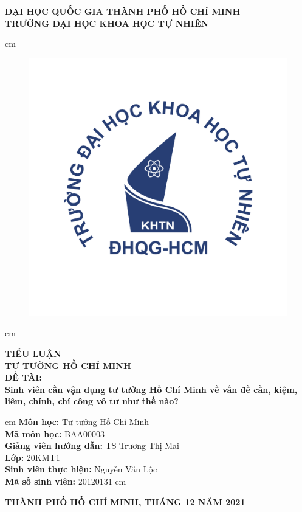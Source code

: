 \begin{titlepage}
\begin{mybox}
\begin{center}
\fontsize{12}{12}\selectfont
\textbf{ĐẠI HỌC QUỐC GIA THÀNH PHỐ HỒ CHÍ MINH}\\
\textbf{TRƯỜNG ĐẠI HỌC KHOA HỌC TỰ NHIÊN}
\end{center}
 cm
\begin{figure}[H]
\begin{center}
\includegraphics[scale=0.25]{figures/logo}
\end{center}
\end{figure}
 cm
\begin{center}
\fontsize{18}{14}\selectfont
\textbf{TIỂU LUẬN}\\
\fontsize{26}{16}\selectfont
\textbf{TƯ TƯỞNG HỒ CHÍ MINH}\\
\fontsize{18}{12}\selectfont
\textbf{ĐỀ TÀI: }\\
\textbf{Sinh viên cần vận dụng tư tưởng Hồ Chí Minh về vấn đề cần, kiệm, liêm, chính, chí công vô tư như thế nào?}
\end{center}
 cm
\fontsize{14}{12}\selectfont
\textbf{Môn học:} Tư tưởng Hồ Chí Minh\\
\textbf{Mã môn học:} BAA00003\\
\textbf{Giảng viên hướng dẫn:} TS Trương Thị Mai\\
\textbf{Lớp:} 20KMT1\\
\textbf{Sinh viên thực hiện:} Nguyễn Văn Lộc\\
\textbf{Mã số sinh viên:} 20120131
 cm
\begin{center}
\textbf{THÀNH PHỐ HỒ CHÍ MINH, THÁNG 12 NĂM 2021}
\end{center}
\end{mybox}
\end{titlepage}